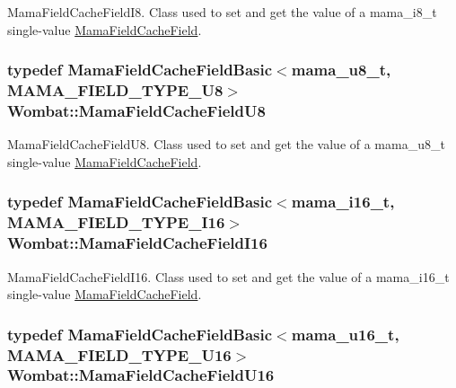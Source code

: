 MamaFieldCacheFieldI8. Class used to set and get the value of a mama\_\-i8\_\-t single-\/value {\ttfamily \hyperlink{classWombat_1_1MamaFieldCacheField}{MamaFieldCacheField}}. \hypertarget{namespaceWombat_a05c15419f040976fdb0d3566bee3a391}{
\subsubsection[{MamaFieldCacheFieldU8}]{\setlength{\rightskip}{0pt plus 5cm}typedef {\bf MamaFieldCacheFieldBasic}$<$mama\_\-u8\_\-t, MAMA\_\-FIELD\_\-TYPE\_\-U8$>$ {\bf Wombat::MamaFieldCacheFieldU8}}}
\label{namespaceWombat_a05c15419f040976fdb0d3566bee3a391}


MamaFieldCacheFieldU8. Class used to set and get the value of a mama\_\-u8\_\-t single-\/value {\ttfamily \hyperlink{classWombat_1_1MamaFieldCacheField}{MamaFieldCacheField}}. \hypertarget{namespaceWombat_a208ee53b62b8b5c5581a6e42d57924ad}{
\subsubsection[{MamaFieldCacheFieldI16}]{\setlength{\rightskip}{0pt plus 5cm}typedef {\bf MamaFieldCacheFieldBasic}$<$mama\_\-i16\_\-t, MAMA\_\-FIELD\_\-TYPE\_\-I16$>$ {\bf Wombat::MamaFieldCacheFieldI16}}}
\label{namespaceWombat_a208ee53b62b8b5c5581a6e42d57924ad}


MamaFieldCacheFieldI16. Class used to set and get the value of a mama\_\-i16\_\-t single-\/value {\ttfamily \hyperlink{classWombat_1_1MamaFieldCacheField}{MamaFieldCacheField}}. \hypertarget{namespaceWombat_a16f910230b180a2fbf517c2f1ea89f6e}{
\subsubsection[{MamaFieldCacheFieldU16}]{\setlength{\rightskip}{0pt plus 5cm}typedef {\bf MamaFieldCacheFieldBasic}$<$mama\_\-u16\_\-t, MAMA\_\-FIELD\_\-TYPE\_\-U16$>$ {\bf Wombat::MamaFieldCacheFieldU16}}}
\label{namespaceWombat_a16f910230b180a2fbf517c2f1ea89f6e}


